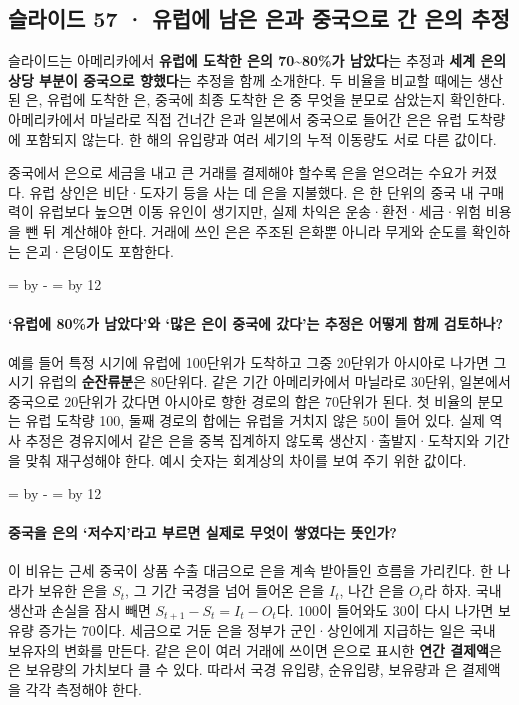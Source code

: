 \documentclass[10pt,a4paper]{article}
\newcommand{\ReserveQuestionSpace}{%
  \par\begingroup
  \dimen0=\pagegoal \advance\dimen0 by -\pagetotal
  \dimen2=\baselineskip \multiply\dimen2 by 12
  \ifdim\dimen0<\dimen2 \newpage\fi
  \endgroup}
\begin{document}
\subsection{슬라이드 57 · 유럽에 남은 은과 중국으로 간 은의 추정}
슬라이드는 아메리카에서 \textbf{유럽에 도착한 은의 70\textasciitilde{}80\%가 남았다}는 추정과 \textbf{세계 은의 상당 부분이 중국으로 향했다}는 추정을 함께 소개한다. 두 비율을 비교할 때에는 생산된 은, 유럽에 도착한 은, 중국에 최종 도착한 은 중 무엇을 분모로 삼았는지 확인한다. 아메리카에서 마닐라로 직접 건너간 은과 일본에서 중국으로 들어간 은은 유럽 도착량에 포함되지 않는다. 한 해의 유입량과 여러 세기의 누적 이동량도 서로 다른 값이다.\par

중국에서 은으로 세금을 내고 큰 거래를 결제해야 할수록 은을 얻으려는 수요가 커졌다. 유럽 상인은 비단·도자기 등을 사는 데 은을 지불했다. 은 한 단위의 중국 내 구매력이 유럽보다 높으면 이동 유인이 생기지만, 실제 차익은 운송·환전·세금·위험 비용을 뺀 뒤 계산해야 한다. 거래에 쓰인 은은 주조된 은화뿐 아니라 무게와 순도를 확인하는 은괴·은덩이도 포함한다.\par

\ReserveQuestionSpace
\paragraph{‘유럽에 80\%가 남았다’와 ‘많은 은이 중국에 갔다’는 추정은 어떻게 함께 검토하나?}
예를 들어 특정 시기에 유럽에 100단위가 도착하고 그중 20단위가 아시아로 나가면 그 시기 유럽의 \textbf{순잔류분}은 80단위다. 같은 기간 아메리카에서 마닐라로 30단위, 일본에서 중국으로 20단위가 갔다면 아시아로 향한 경로의 합은 70단위가 된다. 첫 비율의 분모는 유럽 도착량 100, 둘째 경로의 합에는 유럽을 거치지 않은 50이 들어 있다. 실제 역사 추정은 경유지에서 같은 은을 중복 집계하지 않도록 생산지·출발지·도착지와 기간을 맞춰 재구성해야 한다. 예시 숫자는 회계상의 차이를 보여 주기 위한 값이다.\par

\ReserveQuestionSpace
\paragraph{중국을 은의 ‘저수지’라고 부르면 실제로 무엇이 쌓였다는 뜻인가?}
이 비유는 근세 중국이 상품 수출 대금으로 은을 계속 받아들인 흐름을 가리킨다. 한 나라가 보유한 은을 $S_t$, 그 기간 국경을 넘어 들어온 은을 $I_t$, 나간 은을 $O_t$라 하자. 국내 생산과 손실을 잠시 빼면 $S_{t+1}-S_t=I_t-O_t$다. 100이 들어와도 30이 다시 나가면 보유량 증가는 70이다. 세금으로 거둔 은을 정부가 군인·상인에게 지급하는 일은 국내 보유자의 변화를 만든다. 같은 은이 여러 거래에 쓰이면 은으로 표시한 \textbf{연간 결제액}은 은 보유량의 가치보다 클 수 있다. 따라서 국경 유입량, 순유입량, 보유량과 은 결제액을 각각 측정해야 한다.\par
\end{document}
